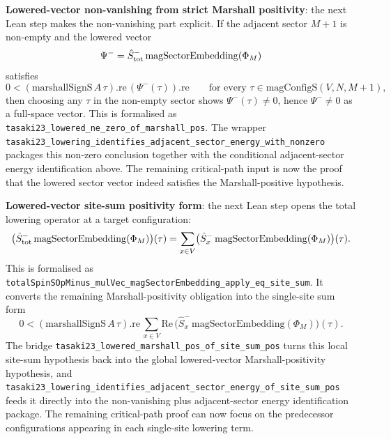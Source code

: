 \documentclass[a4paper,11pt]{article}
\begin{document}
\textbf{Lowered-vector non-vanishing from strict Marshall positivity}:
the next Lean step makes the non-vanishing part explicit.  If the
adjacent sector \(M+1\) is non-empty and the lowered vector
\[
  \Psi^- =
  \hat S^-_{\rm tot}\,\mathrm{magSectorEmbedding}(\Phi_M)
\]
satisfies
\[
  0 <
  (\mathrm{marshallSignS}\,A\,\tau).\mathrm{re}\,
  (\Psi^-(\tau)).\mathrm{re}
  \qquad
  \text{for every }\tau\in\mathrm{magConfigS}(V,N,M+1),
\]
then choosing any \(\tau\) in the non-empty sector shows
\(\Psi^-(\tau)\neq 0\), hence \(\Psi^-\neq 0\) as a full-space vector.
This is formalised as
\texttt{tasaki23\_lowered\_ne\_zero\_of\_marshall\_pos}.  The wrapper
\texttt{tasaki23\_lowering\_identifies\_adjacent\_sector\_energy\_with\_nonzero}
packages this non-zero conclusion together with the conditional
adjacent-sector energy identification above.  The remaining
critical-path input is now the proof that the lowered sector vector
indeed satisfies the Marshall-positive hypothesis.

\textbf{Lowered-vector site-sum positivity form}: the next Lean step
opens the total lowering operator at a target configuration:
\[
  \bigl(\hat S^-_{\rm tot}\,\mathrm{magSectorEmbedding}(\Phi_M)\bigr)(\tau)
  =
  \sum_{x\in V}
  \bigl(\hat S^-_x\,\mathrm{magSectorEmbedding}(\Phi_M)\bigr)(\tau).
\]
This is formalised as
\texttt{totalSpinSOpMinus\_mulVec\_magSectorEmbedding\_apply\_eq\_site\_sum}.
It converts the remaining Marshall-positivity obligation into the
single-site sum form
\[
  0 <
  (\mathrm{marshallSignS}\,A\,\tau).\mathrm{re}\,
  \sum_{x\in V}
  \mathrm{Re}\,
  \bigl(\hat S^-_x\,\mathrm{magSectorEmbedding}(\Phi_M)\bigr)(\tau).
\]
The bridge
\texttt{tasaki23\_lowered\_marshall\_pos\_of\_site\_sum\_pos} turns this
local site-sum hypothesis back into the global lowered-vector
Marshall-positivity hypothesis, and
\texttt{tasaki23\_lowering\_identifies\_adjacent\_sector\_energy\_of\_site\_sum\_pos}
feeds it directly into the non-vanishing plus adjacent-sector energy
identification package.  The remaining critical-path proof can now
focus on the predecessor configurations appearing in each single-site
lowering term.
\end{document}
